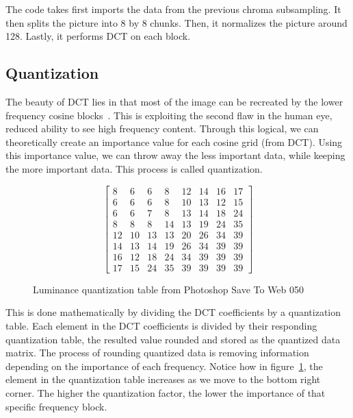 \documentclass{article}
\begin{document}
The code takes first imports the data from the previous chroma subsampling.
It then splits the picture into 8 by 8 chunks.
Then, it normalizes the picture around 128.
Lastly, it performs DCT on each block.

\subsection{Quantization}\label{quantize}
The beauty of DCT lies in that most of the image can be recreated by the lower frequency cosine blocks~\autocite{jpgYT}.
This is exploiting the second flaw in the human eye, reduced ability to see high frequency content.
Through this logical, we can theoretically create an importance value for each cosine grid (from DCT).
Using this importance value, we can throw away the less important data, while keeping the more important data.
This process is called quantization.

\begin{figure}[h]
\centering
\begin{equation}
	\begin{bmatrix}
		8  & 6  & 6  & 8  & 12 & 14 & 16 & 17 \\
		6  & 6  & 6  & 8  & 10 & 13 & 12 & 15 \\
		6  & 6  & 7  & 8  & 13 & 14 & 18 & 24 \\
		8  & 8  & 8  & 14 & 13 & 19 & 24 & 35 \\
		12 & 10 & 13 & 13 & 20 & 26 & 34 & 39 \\
		14 & 13 & 14 & 19 & 26 & 34 & 39 & 39 \\
		16 & 12 & 18 & 24 & 34 & 39 & 39 & 39 \\
		17 & 15 & 24 & 35 & 39 & 39 & 39 & 39
	\end{bmatrix}
\end{equation}
\label{fig:quantization}
\caption{Luminance quantization table from Photoshop Save To Web 050~\autocite{quantization}}
\end{figure}

This is done mathematically by dividing the DCT coefficients by a quantization table.
Each element in the DCT coefficients is divided by their responding quantization table, the resulted value rounded and stored as the quantized data matrix.
The process of rounding quantized data is removing information depending on the importance of each frequency.
Notice how in figure~\ref{fig:quantization}, the element in the quantization table increases as we move to the bottom right corner.
The higher the quantization factor, the lower the importance of that specific frequency block.
\end{document}
